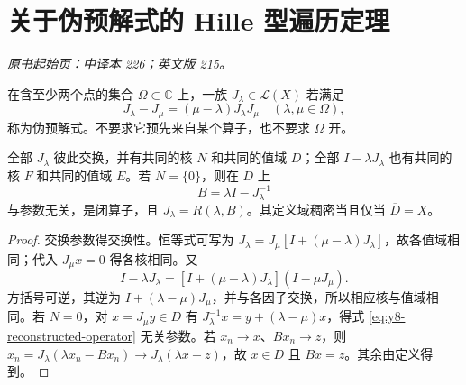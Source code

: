 \section{关于伪预解式的 Hille 型遍历定理}\label{sec:yosida-08-04}
\noindent\textit{原书起始页：中译本 226；英文版 215。}

\begin{definition}[伪预解式]
在含至少两个点的集合 $\Omega\subset\mathbb C$ 上，一族 $J_\lambda\in\mathcal L(X)$ 若满足
\begin{equation}\label{eq:y8-pseudo-identity}
 J_\lambda-J_\mu=(\mu-\lambda)J_\lambda J_\mu\quad(\lambda,\mu\in\Omega),
\end{equation}
称为伪预解式。不要求它预先来自某个算子，也不要求 $\Omega$ 开。
\end{definition}

\begin{proposition}\label{prop:y8-pseudo-reconstruction}
全部 $J_\lambda$ 彼此交换，并有共同的核 $N$ 和共同的值域 $D$；全部 $I-\lambda J_\lambda$ 也有共同的核 $F$ 和共同的值域 $E$。若 $N=\{0\}$，则在 $D$ 上
\begin{equation}\label{eq:y8-reconstructed-operator}
 B=\lambda I-J_\lambda^{-1}
\end{equation}
与参数无关，是闭算子，且 $J_\lambda=R(\lambda,B)$。其定义域稠密当且仅当 $\overline D=X$。
\end{proposition}
\begin{proof}
交换参数得交换性。恒等式可写为
$J_\lambda=J_\mu[I+(\mu-\lambda)J_\lambda]$，故各值域相同；代入 $J_\mu x=0$ 得各核相同。又
\[
 I-\lambda J_\lambda
 =[I+(\mu-\lambda)J_\lambda](I-\mu J_\mu).
\]
方括号可逆，其逆为 $I+(\lambda-\mu)J_\mu$，并与各因子交换，所以相应核与值域相同。若 $N=0$，对 $x=J_\mu y\in D$ 有
$J_\lambda^{-1}x=y+(\lambda-\mu)x$，得式 \eqref{eq:y8-reconstructed-operator} 无关参数。若 $x_n\to x$、$Bx_n\to z$，则
$x_n=J_\lambda(\lambda x_n-Bx_n)\to J_\lambda(\lambda x-z)$，故 $x\in D$ 且 $Bx=z$。其余由定义得到。
\end{proof}

